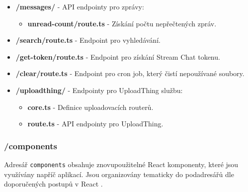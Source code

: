 \documentclass[12pt]{article}
\begin{document}
\begin{itemize}
  \item \textbf{/messages/} - API endpointy pro zprávy:
  \begin{itemize}
    \item \textbf{unread-count/route.ts} - Získání počtu nepřečtených zpráv.
  \end{itemize}
  
  \item \textbf{/search/route.ts} - Endpoint pro vyhledávání.
  
  \item \textbf{/get-token/route.ts} - Endpoint pro získání Stream Chat tokenu.
  
  \item \textbf{/clear/route.ts} - Endpoint pro cron job, který čistí nepoužívané soubory.
  
  \item \textbf{/uploadthing/} - Endpointy pro UploadThing službu:
  \begin{itemize}
    \item \textbf{core.ts} - Definice uploadovacích routerů.
    \item \textbf{route.ts} - API endpointy pro UploadThing.
  \end{itemize}
\end{itemize}

\subsubsection{/components}

Adresář \texttt{components} obsahuje znovupoužitelné React komponenty, které jsou využívány napříč aplikací. Jsou organizovány tematicky do podadresářů dle doporučených postupů v React \citep{React2023}.
\end{document}
